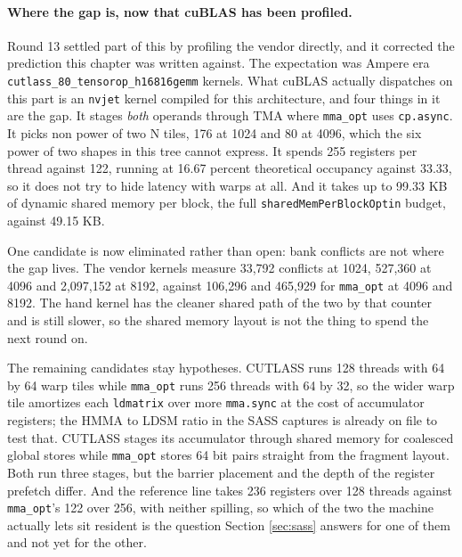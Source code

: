 \begin{table}[htbp]
\centering

\caption{The gap against the CUTLASS reference line, from the committed locked
clock sweep. CUTLASS was not run at 128 to 768 cubed, and those cells read pending
rather than being extrapolated from the shapes that were run.}
\label{tab:cutlassgap}
\end{table}

\paragraph{Where the gap is, now that cuBLAS has been profiled.} Round 13 settled
part of this by profiling the vendor directly, and it corrected the prediction this
chapter was written against. The expectation was Ampere era
\texttt{cutlass\_80\_tensorop\_h16816gemm} kernels. What cuBLAS actually dispatches
on this part is an \texttt{nvjet} kernel compiled for this architecture, and four
things in it are the gap. It stages \emph{both} operands through TMA where
\texttt{mma\_opt} uses \texttt{cp.async}. It picks non power of two N tiles, 176 at
1024 and 80 at 4096, which the six power of two shapes in this tree cannot express.
It spends 255 registers per thread against 122, running at 16.67 percent
theoretical occupancy against 33.33, so it does not try to hide latency with warps
at all. And it takes up to 99.33 KB of dynamic shared memory per block, the full
\texttt{sharedMemPerBlockOptin} budget, against 49.15 KB.

One candidate is now eliminated rather than open: bank conflicts are not where the
gap lives. The vendor kernels measure 33,792 conflicts at 1024, 527,360 at 4096 and
2,097,152 at 8192, against 106,296 and 465,929 for \texttt{mma\_opt} at 4096 and
8192. The hand kernel has the cleaner shared path of the two by that counter and is
still slower, so the shared memory layout is not the thing to spend the next round
on.

The remaining candidates stay hypotheses. CUTLASS runs 128 threads with 64 by 64
warp tiles while \texttt{mma\_opt} runs 256 threads with 64 by 32, so the wider
warp tile amortizes each \texttt{ldmatrix} over more \texttt{mma.sync} at the cost
of accumulator registers; the HMMA to LDSM ratio in the SASS captures is already
on file to test that. CUTLASS stages its accumulator through shared memory for
coalesced global stores while \texttt{mma\_opt} stores 64 bit pairs straight from
the fragment layout. Both run three stages, but the barrier placement and the
depth of the register prefetch differ. And the reference line takes 236 registers
over 128 threads against \texttt{mma\_opt}'s 122 over 256, with neither spilling,
so which of the two the machine actually lets sit resident is the question Section
\ref{sec:sass} answers for one of them and not yet for the other.
